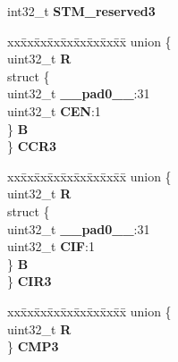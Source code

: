 \begin{DoxyCompactItemize}
\begin{tabbing}
\end{tabbing}\item 
\mbox{\label{structSTM__tag_ac4c7d81b70c31d024a723866bb579ab3}} 
int32\+\_\+t {\bfseries S\+T\+M\+\_\+reserved3}
\item 
\mbox{\label{structSTM__tag_a651a104e86b361dde7a62a64007b41d5}} 
\begin{tabbing}
xx\=xx\=xx\=xx\=xx\=xx\=xx\=xx\=xx\=\kill
union \{\\
\>uint32\_t {\bfseries R}\\
\>struct \{\\
\>\>uint32\_t {\bfseries \_\_pad0\_\_}:31\\
\>\>uint32\_t {\bfseries CEN}:1\\
\>\} {\bfseries B}\\
\} {\bfseries CCR3}\\

\end{tabbing}\item 
\mbox{\label{structSTM__tag_af95e2dc1750d801fbca01a82a8e0918b}} 
\begin{tabbing}
xx\=xx\=xx\=xx\=xx\=xx\=xx\=xx\=xx\=\kill
union \{\\
\>uint32\_t {\bfseries R}\\
\>struct \{\\
\>\>uint32\_t {\bfseries \_\_pad0\_\_}:31\\
\>\>uint32\_t {\bfseries CIF}:1\\
\>\} {\bfseries B}\\
\} {\bfseries CIR3}\\

\end{tabbing}\item 
\mbox{\label{structSTM__tag_aaeb7aea237c36118a2eebe8d57df324c}} 
\begin{tabbing}
xx\=xx\=xx\=xx\=xx\=xx\=xx\=xx\=xx\=\kill
union \{\\
\>uint32\_t {\bfseries R}\\
\} {\bfseries CMP3}\\


\end{tabbing}
\end{DoxyCompactItemize}
